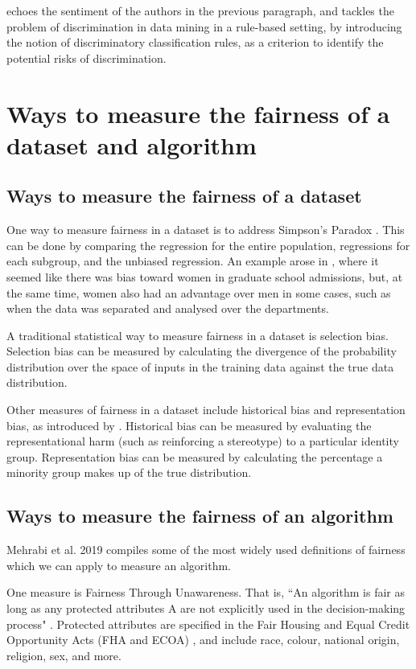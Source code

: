 \documentclass[conference]{IEEEtran}
\begin{document}
\cite{10.1145/1401890.1401959} echoes the sentiment of the authors in the previous paragraph, and tackles the problem of discrimination in data mining in a rule-based setting, by introducing the notion of discriminatory classification rules, as a criterion to identify the potential risks of discrimination.

\section{Ways to measure the fairness of a dataset and algorithm}
\subsection{Ways to measure the fairness of a dataset}
One way to measure fairness in a dataset is to address Simpson's Paradox \cite{10.2307/2284382}. This can be done by comparing the regression for the entire population, regressions for each subgroup, and the unbiased regression. An example arose in \cite{Bickel398}, where it seemed like there was bias toward women in graduate school admissions, but, at the same time, women also had an advantage over men in some cases, such as when the data was separated and analysed over the departments.

A traditional statistical way to measure fairness in a dataset is selection bias. Selection bias can be measured by calculating the divergence of the probability distribution over the space of inputs in the training data against the true data distribution.

Other measures of fairness in a dataset include historical bias and representation bias, as introduced by \cite{DBLP:journals/corr/abs-1901-10002}. Historical bias can be measured by evaluating the representational harm (such as reinforcing a stereotype) to a particular identity group. Representation bias can be measured by calculating the percentage a minority group makes up of the true distribution. 

\subsection{Ways to measure the fairness of an algorithm}
Mehrabi et al. 2019 \cite{DBLP:journals/corr/abs-1908-09635} compiles some of the most widely used definitions of fairness which we can apply to measure an algorithm.

One measure is Fairness Through Unawareness. That is, ``An algorithm is fair as long as any protected attributes A are not explicitly used in the decision-making process" \cite{GrgicHlaca2016TheCF, NIPS2017_a486cd07}. Protected attributes are specified in the Fair Housing and Equal Credit Opportunity Acts (FHA and ECOA) \cite{Chen_2019}, and include race, colour, national origin, religion, sex, and more.
\end{document}
